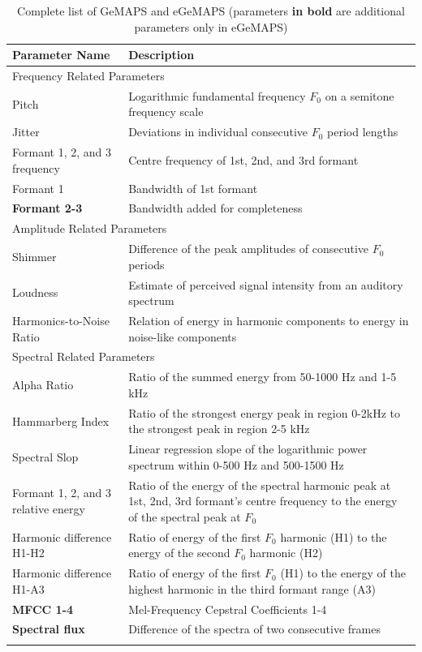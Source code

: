 \begin{table}[ht]
    \small
    \centering
    \caption{Complete list of GeMAPS and eGeMAPS (parameters \textbf{in bold} are additional parameters only in eGeMAPS)}
    \begin{tabular}{p{3.5cm}|p{9cm}}
        \Xhline{2\arrayrulewidth}
        Parameter Name & Description \\
        \hline
        \multicolumn{2}{l}{Frequency Related Parameters} \\
        \hline
        Pitch & Logarithmic fundamental frequency $F_0$ on a semitone frequency scale \\
        Jitter & Deviations in individual consecutive $F_0$ period lengths \\
        Formant 1, 2, and 3 frequency & Centre frequency of 1st, 2nd, and 3rd formant \\
        Formant 1 & Bandwidth of 1st formant \\
        \textbf{Formant 2-3} & Bandwidth added for completeness \\
        \hline
        \multicolumn{2}{l}{Amplitude Related Parameters} \\
        \hline
        Shimmer & Difference of the peak amplitudes of consecutive $F_0$ periods \\
        Loudness & Estimate of perceived signal intensity from an auditory spectrum \\
        Harmonics-to-Noise Ratio & Relation of energy in harmonic components to energy in noise-like components \\
        \hline
        \multicolumn{2}{l}{Spectral Related Parameters} \\
        \hline
        Alpha Ratio & Ratio of the summed energy from 50-1000 Hz and 1-5 kHz \\
        Hammarberg Index & Ratio of the strongest energy peak in region 0-2kHz to the strongest peak in region 2-5 kHz \\
        Spectral Slop & Linear regression slope of the logarithmic power spectrum within 0-500 Hz and 500-1500 Hz \\
        Formant 1, 2, and 3 relative energy & Ratio of the energy of the spectral harmonic peak at 1st, 2nd, 3rd formant's centre frequency to the energy of the spectral peak at $F_0$ \\
        Harmonic difference H1-H2 & Ratio of energy of the first $F_0$ harmonic (H1) to the energy of the second $F_0$ harmonic (H2) \\
        Harmonic difference H1-A3 & Ratio of energy of the first $F_0$ (H1) to the energy of the highest harmonic in the third formant range (A3) \\
        \textbf{MFCC 1-4} & Mel-Frequency Cepstral Coefficients 1-4 \\
        \textbf{Spectral flux} & Difference of the spectra of two consecutive frames \\
        \Xhline{2\arrayrulewidth}
    \end{tabular}
    \label{tab:list_egemaps}
\end{table}





